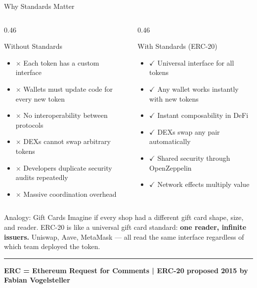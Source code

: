\documentclass[8pt,aspectratio=169]{beamer}
\newcommand{\bottomnote}[1]{\vfill\vspace{-2mm}\textcolor{mllavender2}{\rule{\textwidth}{0.4pt}}\vspace{1mm}\footnotesize\textbf{#1}}
\begin{document}
\begin{frame}{Why Standards Matter}
  \begin{columns}[T]
    \begin{column}{0.46\textwidth}
      \begin{block}{Without Standards}
        \begin{itemize}\setlength\itemsep{2pt}
          \item \textcolor{mlred}{$\times$} Each token has a custom interface
          \item \textcolor{mlred}{$\times$} Wallets must update code for every new token
          \item \textcolor{mlred}{$\times$} No interoperability between protocols
          \item \textcolor{mlred}{$\times$} DEXs cannot swap arbitrary tokens
          \item \textcolor{mlred}{$\times$} Developers duplicate security audits repeatedly
          \item \textcolor{mlred}{$\times$} Massive coordination overhead
        \end{itemize}
      \end{block}
    \end{column}
    \begin{column}{0.46\textwidth}
      \begin{block}{With Standards (ERC-20)}
        \begin{itemize}\setlength\itemsep{2pt}
          \item \textcolor{mlgreen}{$\checkmark$} Universal interface for all tokens
          \item \textcolor{mlgreen}{$\checkmark$} Any wallet works instantly with new tokens
          \item \textcolor{mlgreen}{$\checkmark$} Instant composability in DeFi
          \item \textcolor{mlgreen}{$\checkmark$} DEXs swap any pair automatically
          \item \textcolor{mlgreen}{$\checkmark$} Shared security through OpenZeppelin
          \item \textcolor{mlgreen}{$\checkmark$} Network effects multiply value
        \end{itemize}
      \end{block}
    \end{column}
  \end{columns}
  \vspace{4pt}
  \begin{block}{Analogy: Gift Cards}
    \small
    Imagine if every shop had a different gift card shape, size, and reader.
    ERC-20 is like a universal gift card standard: \textbf{one reader, infinite issuers.}
    Uniswap, Aave, MetaMask --- all read the same interface regardless of which team
    deployed the token.
  \end{block}
  \bottomnote{ERC = Ethereum Request for Comments | ERC-20 proposed 2015 by Fabian Vogelsteller}
\end{frame}
\end{document}
